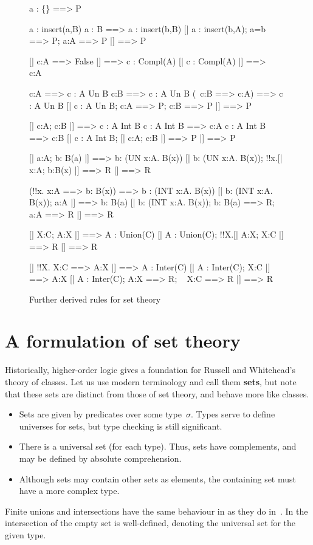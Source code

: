 \begin{figure} \underscoreon
\begin{ttbox}
   a : \{\} ==> P

 a : insert(a,B)
 a : B ==> a : insert(b,B)
  [| a : insert(b,A);  a=b ==> P;  a:A ==> P |] ==> P

   [| c:A ==> False |] ==> c : Compl(A)
   [| c : Compl(A) |] ==> ~ c:A

     c:A ==> c : A Un B
     c:B ==> c : A Un B
     (~c:B ==> c:A) ==> c : A Un B
      [| c : A Un B;  c:A ==> P;  c:B ==> P |] ==> P

     [| c:A;  c:B |] ==> c : A Int B
    c : A Int B ==> c:A
    c : A Int B ==> c:B
     [| c : A Int B;  [| c:A; c:B |] ==> P |] ==> P

     [| a:A;  b: B(a) |] ==> b: (UN x:A. B(x))
     [| b: (UN x:A. B(x));  !!x.[| x:A;  b:B(x) |] ==> R |] ==> R

    (!!x. x:A ==> b: B(x)) ==> b : (INT x:A. B(x))
    [| b: (INT x:A. B(x));  a:A |] ==> b: B(a)
    [| b: (INT x:A. B(x));  b: B(a) ==> R;  ~ a:A ==> R |] ==> R

   [| X:C;  A:X |] ==> A : Union(C)
   [| A : Union(C);  !!X.[| A:X;  X:C |] ==> R |] ==> R

   [| !!X. X:C ==> A:X |] ==> A : Inter(C)
   [| A : Inter(C);  X:C |] ==> A:X
   [| A : Inter(C);  A:X ==> R;  ~ X:C ==> R |] ==> R
\end{ttbox}
\caption{Further derived rules for set theory} \label{hol-set2}
\end{figure}


\section{A formulation of set theory}
Historically, higher-order logic gives a foundation for Russell and
Whitehead's theory of classes.  Let us use modern terminology and call them
{\bf sets}, but note that these sets are distinct from those of {\ZF} set
theory, and behave more like {\ZF} classes.
\begin{itemize}
\item
Sets are given by predicates over some type~$\sigma$.  Types serve to
define universes for sets, but type checking is still significant.
\item
There is a universal set (for each type).  Thus, sets have complements, and
may be defined by absolute comprehension.
\item
Although sets may contain other sets as elements, the containing set must
have a more complex type.
\end{itemize}
Finite unions and intersections have the same behaviour in {\HOL} as they
do in~{\ZF}.  In {\HOL} the intersection of the empty set is well-defined,
denoting the universal set for the given type.

